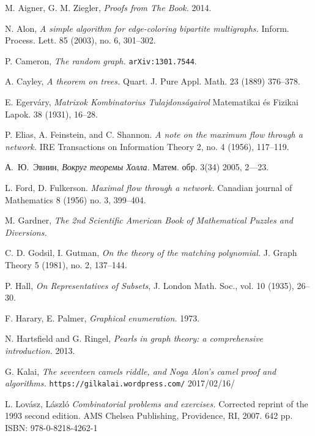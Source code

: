 \begin{thebibliography}{52}

 M. Aigner, G. M. Ziegler,  \emph{Proofs from The Book.} 2014.

 N. Alon,
\emph{A simple algorithm for edge-coloring bipartite multigraphs.}
Inform. Process. Lett. 85 (2003), no. 6, 301--302. 

 P. Cameron,   \emph{The random graph.} \texttt{arXiv:1301.7544}.

A. Cayley, \emph{A theorem on trees.} Quart. J. Pure Appl. Math. 23 (1889) 376--378.


E. Egerv\'ary, 
\emph{Matrixok Kombinatorius Tulajdons\'agairol}
Matematikai \'es Fizikai Lapok. 38 (1931), 16--28.

 P. Elias, A. Feinstein, and C. Shannon. 
\emph{A note on the maximum flow through a network.}
IRE Transactions on Information Theory 2, no. 4 (1956), 117--119.

 \begin{otherlanguage}{russian}
А.~Ю.~Эвнин,
\emph{Вокруг теоремы Холла.} Матем. обр. 3(34) 2005, 2---23.
 \end{otherlanguage}

 L. Ford, D. Fulkerson. 
\emph{Maximal flow through a network.} 
Canadian journal of Mathematics 8 (1956) no. 3, 399--404.

 M. Gardner, \emph{The 2nd Scientific American Book of Mathematical Puzzles and Diversions.}

C. D. Godsil, I. Gutman, 
\emph{On the theory of the matching polynomial.}
J. Graph Theory 5 (1981), no. 2, 137–144.

P. Hall, 
\emph{On Representatives of Subsets}, 
J. London Math. Soc., vol. 10 (1935), 26--30.

 F. Harary, E. Palmer, 
\emph{Graphical enumeration.} 1973.

 N. Hartsfield and  G. Ringel, 
\emph{Pearls in graph theory: a comprehensive introduction.} 2013.

 G. Kalai, 
\emph{The seventeen camels riddle, and Noga Alon’s camel proof and algorithms.}
\texttt{https://gilkalai.wordpress.com/} 2017/02/16/ 

 L. Lov\'asz, L\'aszl\'o \emph{Combinatorial problems and exercises.} Corrected reprint of the 1993 second edition. AMS Chelsea Publishing, Providence, RI, 2007. 642 pp. ISBN: 978-0-8218-4262-1


\end{thebibliography}
